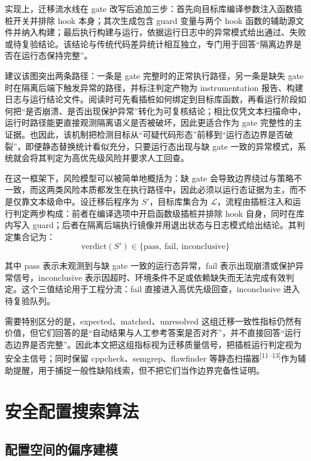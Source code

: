 \documentclass[UTF8,a4paper,12pt,twoside]{ctexart}  %
\begin{document}
实现上，迁移流水线在 gate
改写后追加三步：首先向目标库编译参数注入函数插桩开关并排除 hook
本身；其次生成包含 guard 变量与两个 hook
函数的辅助源文件并纳入构建；最后执行构建与运行，依据运行日志中的异常模式给出通过、失败或待复验结论。该结论与传统代码差异统计相互独立，专门用于回答``隔离边界是否在运行态保持完整''。

建议该图突出两条路径：一条是 gate 完整时的正常执行路径，另一条是缺失
gate 时在隔离后端下触发异常的路径，并标注判定产物为 instrumentation
报告、构建日志与运行结论文件。阅读时可先看插桩如何绑定到目标库函数，再看运行阶段如何把``是否崩溃、是否出现保护异常''转化为可复核结论；相比仅凭文本扫描命中，运行时路径能更直接观测隔离语义是否被破坏，因此更适合作为 gate 完整性的主证据。也因此，该机制把检测目标从``可疑代码形态''前移到``运行态边界是否破裂''，即便静态替换统计看似充分，只要运行态出现与缺 gate 一致的异常模式，系统就会将其判定为高优先级风险并要求人工回查。

在这一框架下，风险模型可以被简单地概括为：缺 gate
会导致边界绕过与策略不一致，而这两类风险本质都发生在执行路径中，因此必须以运行态证据为主，而不是仅靠文本级命中。设迁移后程序为
\(S'\)，目标库集合为
\(\mathcal{L}\)，流程由插桩注入和运行判定两步构成：前者在编译选项中开启函数级插桩并排除
hook 自身，同时在库内写入
guard；后者在隔离后端执行镜像并用退出状态与日志模式给出结论。其判定集合记为：
\begin{equation}
\text{verdict}(S') \in \{\text{pass},\ \text{fail},\ \text{inconclusive}\}
\end{equation}

其中 pass 表示未观测到与缺 gate 一致的运行态异常，fail
表示出现崩溃或保护异常信号，inconclusive
表示因超时、环境条件不足或依赖缺失而无法完成有效判定。这个三值结论用于工程分流：fail
直接进入高优先级回查，inconclusive 进入待复验队列。

需要特别区分的是，expected、matched、unresolved
这组迁移一致性指标仍然有价值，但它们回答的是``自动结果与人工参考答案是否对齐''，并不直接回答``运行态边界是否完整''。因此本文把这组指标视为迁移质量信号，把插桩运行判定视为安全主信号；同时保留
cppcheck、semgrep、flawfinder
等静态扫描器\textsuperscript{[11--13]}作为辅助提醒，用于捕捉一般性缺陷线索，但不把它们当作边界完备性证明。

\newpage
\section{安全配置搜索算法}

\subsection{配置空间的偏序建模}
\end{document}

